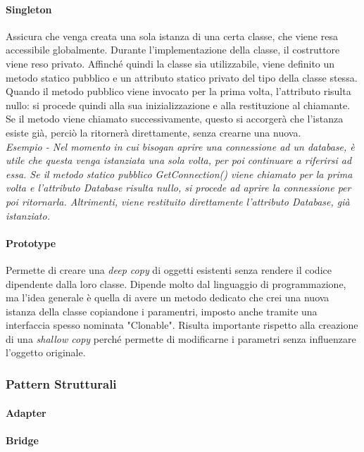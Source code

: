 \documentclass{article}
\begin{document}
            \paragraph{Singleton} Assicura che venga creata una sola istanza di una certa classe, che viene resa accessibile globalmente.
                Durante l'implementazione della classe, il costruttore viene reso privato.
                Affinché quindi la classe sia utilizzabile, viene definito un metodo statico pubblico e un attributo statico privato del tipo della classe stessa.
                Quando il metodo pubblico viene invocato per la prima volta, l'attributo risulta nullo: si procede quindi alla sua inizializzazione e alla restituzione al chiamante.
                Se il metodo viene chiamato successivamente, questo si accorgerà che l'istanza esiste già, perciò la ritornerà direttamente, senza crearne una nuova.\\
                \textit{Esempio - Nel momento in cui bisogan aprire una connessione ad un database, è utile che questa venga istanziata una sola volta, per poi continuare a riferirsi ad essa.
                    Se il metodo statico pubblico GetConnection() viene chiamato per la prima volta e l'attributo Database risulta nullo, si procede ad aprire la connessione per poi ritornarla.
                    Altrimenti, viene restituito direttamente l'attributo Database, già istanziato.
                }  
            \paragraph{Prototype} Permette di creare una \textit{deep copy} di oggetti esistenti senza rendere il codice dipendente dalla loro classe.
                Dipende molto dal linguaggio di programmazione, ma l'idea generale è quella di avere un metodo dedicato che crei una nuova istanza della classe copiandone i paramentri, imposto anche tramite una interfaccia spesso nominata "Clonable".
                Risulta importante rispetto alla creazione di una \textit{shallow copy} perché permette di modificarne i parametri senza influenzare l'oggetto originale. 
        \subsubsection{Pattern Strutturali}
            \paragraph{Adapter}
            \paragraph{Bridge}
\end{document}
